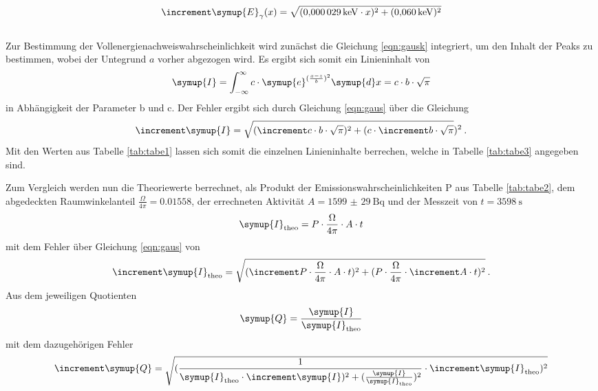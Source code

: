 \begin{equation}
   \increment \symup{E}_{\gamma} (x) =\sqrt{ (\SI{0.000029}{\kilo\electronvolt}\cdot x)^2 +
   (\SI{0.060}{\kilo\electronvolt})^2}
   \label{eqn:fgerade}
\end{equation}
\\
Zur Bestimmung der Vollenergienachweiswahrscheinlichkeit wird zunächst die Gleichung \ref{eqn:gausk}
integriert, um den Inhalt der Peaks zu bestimmen, wobei der Untegrund $a$ vorher abgezogen wird.
Es ergibt sich somit ein Linieninhalt von
\begin{equation}
  \symup{I} =\int_{-\infty}^{\infty} c \cdot \symup{e}^{(\frac{x-z}{b})^2} \symup{d}x
  = c \cdot b \cdot \sqrt{\pi}
  \label{eqn:inh}
\end{equation}
in Abhängigkeit der Parameter b und c.
Der Fehler ergibt sich durch Gleichung \ref{eqn:gaus} über die Gleichung
\begin{equation}
  \increment \symup{I} = \sqrt{ (\increment c \cdot b \cdot \sqrt{\pi})^{2}
   + (c \cdot \increment b \cdot \sqrt{\pi}})^{2} \: .
     \label{eqn:inhf}
\end{equation}
Mit den Werten aus Tabelle \ref{tab:tabe1} lassen sich somit die einzelnen Linieninhalte berrechen,
welche in Tabelle \ref{tab:tabe3} angegeben sind.

Zum Vergleich werden nun die Theoriewerte berrechnet, als Produkt
der Emissionswahrscheinlichkeiten P aus Tabelle \ref{tab:tabe2},
dem abgedeckten Raumwinkelanteil $\frac{\Omega}{4\pi}= 0.01558$, der errechneten Aktivität
$A =\SI{1599(29)}{\becquerel} $
und der Messzeit von $t = \SI{3598}{\second}$
\begin{equation}
  \symup{I}_{\text{theo}} = P\cdot \frac{\Omega}{4\pi} \cdot A \cdot t
  \label{eqn:itheo}
\end{equation}
mit dem Fehler über Gleichung \ref{eqn:gaus} von
\begin{equation}
  \increment \symup{I}_{\text{theo}} = \sqrt{ (\increment P\cdot \frac{\Omega}{4\pi} \cdot A \cdot t)^{2}
   + (P\cdot \frac{\Omega}{4\pi} \cdot \increment A \cdot t)^{2}} \: .
\end{equation}
Aus dem jeweiligen Quotienten
\begin{equation}
  \symup{Q} = \frac{\symup{I}}{\symup{I}_{\text{theo}}}
  \label{eqn:ven1}
\end{equation}
mit dem dazugehörigen Fehler
\begin{equation}
  \increment \symup{Q} = \sqrt{ (\frac{1}{\symup{I}_{\text{theo}} \cdot \increment \symup{I})^{2}
   + (\frac{\symup{I}}{\symup{I}_{\text{theo}}})^{2}}\cdot \increment \symup{I}_{\text{theo}})^{2}}
\end{equation}
